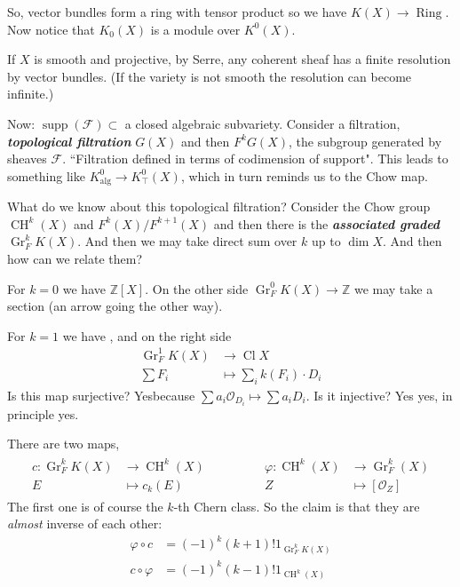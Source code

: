 \documentclass{article}
\newcommand{\Z}{\mathbb{Z}}
\newcommand{\Fc}{\mathcal{F}}
\newcommand{\Oc}{\mathcal{O}}
\DeclareMathOperator{\supp}{supp}
\DeclareMathOperator{\Cl}{Cl}
\DeclareMathOperator{\Ring}{Ring}
\DeclareMathOperator{\CH}{CH}
\DeclareMathOperator{\Gr}{Gr}
\DeclareMathOperator{\alg}{alg}
\begin{document}
So, vector bundles form a ring with tensor product so we have $K(X)\to \Ring$. Now notice that $K_0(X)$ is a module over $K^0(X)$.

If $X$ is smooth and projective, by Serre, any coherent sheaf has a finite resolution by vector bundles. (If the variety is not smooth the resolution can become infinite.)

Now: $\supp(\Fc)\subset$ a closed algebraic subvariety. Consider a filtration, \textbf{\textit{topological filtration}} $G(X)$ and then $F^kG(X)$, the subgroup generated by sheaves $\Fc$. ``Filtration defined in terms of codimension of support". This leads to something like $K^0_{\alg}\to K^0_{\top}(X)$, which in turn reminds us to the Chow map.

What do we know about this topological filtration? Consider the Chow group $\CH^k(X)$ and $F^k(X)/F^{k+1}(X)$ and then there is the \textbf{\textit{associated graded}} $\Gr^k_FK(X)$. And then we may take direct sum over $k$ up to $\dim X$. And then how can we relate them?

For $k=0$ we have $\Z[X]$. On the other side $\Gr^0_FK(X)\to \Z$ we may take a section (an arrow going the other way).

For $k=1$ we have , and on the right side 
\begin{align*}
	\Gr^1_FK(X)&\to\Cl X\\
	\sum F_i&\mapsto\sum_ik(F_i)\cdot D_i
\end{align*}
Is this map surjective? Yesbecause $\sum a_i\Oc_{D_i}\mapsto\sum a_iD_i$. Is it injective? Yes yes, in principle yes.
\begin{claim}
	There are two maps,
	\begin{align*}
		\begin{aligned}
			c:\Gr^k_FK(X)&\to\CH^k(X)\\
			E&\mapsto c_k(E)
		\end{aligned}\qquad\qquad
		\begin{aligned}
			\varphi:\CH^k(X)&\to\Gr_F^k(X)\\
			Z&\mapsto[\Oc_Z]
		\end{aligned}
	\end{align*}
	The first one is of course the $k$-th Chern class. So the claim is that they are \textit{almost} inverse of each other:
	\begin{align*}
		\varphi\circ c&=(-1)^k(k+1)!1_{\Gr^k_FK(X)}\\
		c\circ\varphi&=(-1)^k(k-1)!1_{\CH^k(X)}
	\end{align*}
\end{claim}
\end{document}
